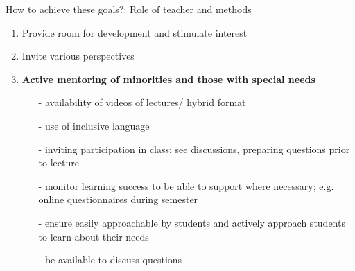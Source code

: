 \begin{frame}{How to achieve these goals?: Role of teacher \alert{and methods}}
	\begin{enumerate}
		\item Provide room for development and stimulate interest
		\item Invite various perspectives
		\item \alert{\textbf{Active mentoring of minorities and those with special needs}}
		\begin{itemize}[<+->]
			\item[-] availability of videos of lectures/ hybrid format
			\item[-] use of inclusive language
			\item[-] inviting participation in class; see discussions, preparing questions prior to lecture
			\item[-] monitor learning success to be able to support where necessary; e.g. online questionnaires during semester
			\item[-] ensure easily approachable by students and actively approach students to learn about their needs
			\item[-] be available to discuss questions
		\end{itemize}
	\end{enumerate}
\end{frame}


